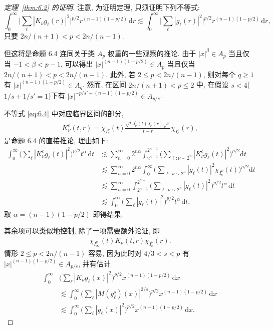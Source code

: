 \begin{proof}[定理~\ref{thm:6.2} 的证明]
注意, 为证明定理, 只须证明下列不等式:
\begin{equation}\label{eq:6.4}
  \int_{0}^{\infty}\Big|\sum_{\ell}|K_{\nu}g_{\ell}(r)|^{2}\Big|^{p/2}r^{(n-1)(1-p/2)}\,\mathrm{d}r
  \lesssim\int_{0}^{\infty}\Big|\sum_{\ell}|g_{\ell}(r)|^{2}\Big|^{p/2}r^{(n-1)(1-p/2)}\,\mathrm{d}r,
\end{equation}
只要 $2n/(n+1) < p < 2n/(n-1)$.

但这将是命题 6.4 连同关于类 $A_{p}$ 权重的一些观察的推论. 由于 $|x|^\beta \in A_p$ 当且仅当 $-1 < \beta < p - 1$, 可以得出 $|x|^{(n-1)(1-p/2)} \in A_p$ 当且仅当 $2n/(n+1) < p < 2n/(n-1)$. 此外, 若 $2 \leq p < 2n/(n-1)$, 则对每个 $q \geq 1$ 有 $|x|^{(n-1)(1-p/2)} \in A_q$. 然而, 在区间 $2n/(n+1) < p \leq 2$ 中, 在假设 $s < 4$($1/s + 1/s' = 1$)下有 $|x|^{-p/s' + (n-1)(1-p/2)} \in A_{p/s}$.

不等式 \eqref{eq:6.4} 中对应临界区间的部分,
\begin{align*}
  K_{\nu}^{c}(t,r)=\chi_{I_{c}^{\nu}}(t)\frac{\sqrt{t}J_{\nu}^{\prime}(t)J_{\nu}(r)\sqrt{r}}{t-r}\chi_{I_{c}^{\nu}}(r),
\end{align*}
是命题 6.4 的直接推论, 理由如下:
\begin{align*}
  \int_{0}^{\infty}\Big(\sum_{\ell}|K_{\nu}^{c} g_{\ell}(t)|^{2}\Big)^{p/2}t^{\alpha}\,\mathrm{d}t
  &\lesssim\sum_{n=0}^{\infty}2^{n\alpha}\int_{2^{n-1}}^{2^{n+1}}
   \Big(\sum_{\ell:\nu\sim 2^{n}}\left|K_{\nu}^{c} g_{\ell}(t)\right|^{2}\Big)^{p/2}\mathrm{d}t\\
  &\lesssim\sum_{n=0}^{\infty}2^{n\alpha}\int_{0}^{\infty}
   \Big(\sum_{\ell:\nu\sim 2^{n}}|g_{\ell}(t)|^{2}\chi_{I_{c}^{\nu}}(t)\Big)^{p/2}\mathrm{d}t\\
  &\lesssim\sum_{n=0}^{\infty}\int_{2^{n-1}}^{2^{n+1}}
   \Big(\sum_{\ell:\nu\sim 2^{n}}|g_{\ell}(t)|^{2}\Big)^{p/2}t^{\alpha}\,\mathrm{d}t\\
  &\lesssim\int_{0}^{\infty}\Big(\sum_{\ell}|g_{\ell}(t)|^{2}\Big)^{p/2}t^{\alpha}\,\mathrm{d}t,
\end{align*}
取 $\alpha = (n - 1)(1 - p/2)$ 即得结果.

其余项可以类似地控制, 除了一项需要额外论证, 即
\begin{align*}
  \chi_{I_{\infty}^{\nu}}(t)K_{\nu}(t,r)\chi_{I_{c}^{\nu}}(r).
\end{align*}
情形 $2 \leq p < 2n/(n-1)$ 容易, 因为此时对 $4/3 < s < p$ 有 $|x|^{(n-1)(1-p/2)} \in A_{p/s}$, 并有估计
\begin{align*}
  \int_{0}^{\infty}&\Big(\sum_{\ell}|K_{\nu}g_{\ell}(x)|^{2}\Big)^{p/2}x^{(n-1)(1-p/2)}\,\mathrm{d}x\\
  &\lesssim\int_{0}^{\infty}\Big(\sum_{\ell}\left|M(g_{\ell}^{s})(x)\right|^{2/s}\Big)^{p/2}x^{(n-1)(1-p/2)}\,\mathrm{d}x\\
  &\lesssim\int_{0}^{\infty}\Big(\sum_{\ell}|g_{\ell}(x)|^{2}\Big)^{p/2}x^{(n-1)(1-p/2)}\,\mathrm{d}x.
\end{align*}


\end{proof}
